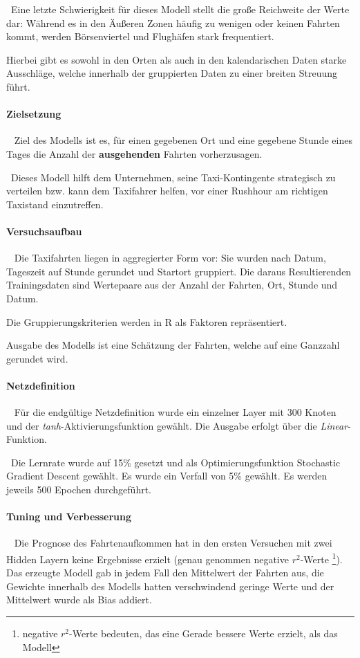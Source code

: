 ~\newline Eine letzte Schwierigkeit für dieses Modell stellt die große Reichweite der Werte dar: Während es in den Äußeren Zonen häufig zu wenigen oder keinen Fahrten kommt, werden Börsenviertel und Flughäfen stark frequentiert. 

Hierbei gibt es sowohl in den Orten als auch in den kalendarischen Daten starke Ausschläge, welche innerhalb der gruppierten Daten zu einer breiten Streuung führt.
\paragraph{Zielsetzung} ~\newline
Ziel des Modells ist es, für einen gegebenen Ort und eine gegebene Stunde eines Tages die Anzahl der \textbf{ausgehenden} Fahrten vorherzusagen. 

~\newline Dieses Modell hilft dem Unternehmen, seine Taxi-Kontingente strategisch zu verteilen bzw. kann dem Taxifahrer helfen, vor einer Rushhour am richtigen Taxistand einzutreffen. 
\paragraph{Versuchsaufbau} ~\newline
Die Taxifahrten liegen in aggregierter Form vor: Sie wurden nach Datum, Tageszeit auf Stunde gerundet und Startort gruppiert. Die daraus Resultierenden Trainingsdaten sind Wertepaare aus der Anzahl der Fahrten, Ort, Stunde und Datum. 

Die Gruppierungskriterien werden in R als Faktoren repräsentiert. 

Ausgabe des Modells ist eine Schätzung der Fahrten, welche auf eine Ganzzahl gerundet wird. 

\paragraph{Netzdefinition} ~\newline
Für die endgültige Netzdefinition wurde ein einzelner Layer mit 300 Knoten und der \textit{tanh}-Aktivierungsfunktion gewählt. Die Ausgabe erfolgt über die \textit{Linear}-Funktion.

~\newline Die Lernrate wurde auf 15\% gesetzt und als Optimierungsfunktion Stochastic Gradient Descent gewählt. Es wurde ein Verfall von 5\% gewählt. Es werden jeweils 500 Epochen durchgeführt. 
\paragraph{Tuning und Verbesserung} ~\newline
Die Prognose des Fahrtenaufkommen hat in den ersten Versuchen mit zwei Hidden Layern keine Ergebnisse erzielt (genau genommen negative $r^2$-Werte \footnote{negative $r^2$-Werte bedeuten, das eine Gerade bessere Werte erzielt, als das Modell}). Das erzeugte Modell gab in jedem Fall den Mittelwert der Fahrten aus, die Gewichte innerhalb des Modells hatten verschwindend geringe Werte und der Mittelwert wurde als Bias addiert. 


